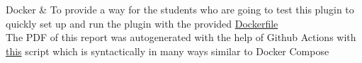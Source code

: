 \documentclass{report}
\begin{document}
\begin{table}[H]
\begin{tblr}
		Docker                 & {\hspace{\dimexpr\labelsep+0.5\tabcolsep} To provide a way for the students who are going to test this plugin to quickly set up and run the plugin with the provided \href{https://github.com/matthejue/RETI-Debugger/blob/main/Dockerfile}{Dockerfile}                                   \\\hspace{\dimexpr\labelsep+0.5\tabcolsep} The PDF of this report was autogenerated with the help of Github Actions with \href{https://github.com/matthejue/RETI-Debugger_Documentation/blob/master/.github/workflows/create_and_upload_pdf.yml}{this} script which is syntactically in many ways similar to Docker Compose}                                                                                                                                       \\

\end{tblr}
\end{table}
\end{document}
